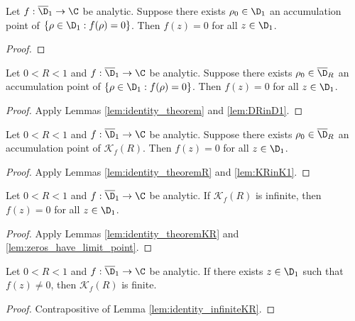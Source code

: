 \begin{lemma}\label{lem:identity_theorem} 
\leanok
Let $f:\overline{\D}_1\to \C$ be analytic. Suppose there exists $\rho_0\in \D_1$ an accumulation point of $\{\rho\in \D_1 : f(\rho)=0\}$. Then $f(z)=0$ for all $z\in \D_1$.
\end{lemma}
\begin{proof}
\leanok
\end{proof}

\begin{lemma}\label{lem:identity_theoremR} 
\leanok
Let $0<R<1$ and $f:\overline{\D}_1\to \C$ be analytic. Suppose there exists $\rho_0\in \overline{\D}_R$ an accumulation point of $\{\rho\in \D_1 : f(\rho)=0\}$. Then $f(z)=0$ for all $z\in \D_1$.
\end{lemma}
\begin{proof}
\leanok
{}
Apply Lemmas \ref{lem:identity_theorem} and \ref{lem:DRinD1}.
\end{proof}


\begin{lemma}[Identity on K]\label{lem:identity_theoremKR} 
\leanok
Let $0<R<1$ and $f:\overline{\D}_1\to \C$ be analytic. Suppose there exists $\rho_0\in \overline{\D}_R$ an accumulation point of $\mathcal{K}_f(R)$. Then $f(z)=0$ for all $z\in \D_1$.
\end{lemma}
\begin{proof}
\leanok
{}
Apply Lemmas \ref{lem:identity_theoremR} and \ref{lem:KRinK1}.
\end{proof}

\begin{lemma}\label{lem:identity_infiniteKR} 
\leanok
Let $0<R<1$ and $f:\overline{\D}_1\to \C$ be analytic. If $\mathcal{K}_f(R)$ is infinite, then $f(z)=0$ for all $z\in \D_1$.
\end{lemma}
\begin{proof}
\leanok
{}
Apply Lemmas \ref{lem:identity_theoremKR} and \ref{lem:zeros_have_limit_point}.
\end{proof}

\begin{lemma}\label{lem:Contra_finiteKR} 
\leanok
Let $0<R<1$ and $f:\overline{\D}_1\to \C$ be analytic. If there exists $z\in\D_1$ such that $f(z)\neq0$, then $\mathcal{K}_f(R)$ is finite.
\end{lemma}
\begin{proof}
\leanok
{}
Contrapositive of Lemma \ref{lem:identity_infiniteKR}.
\end{proof}


